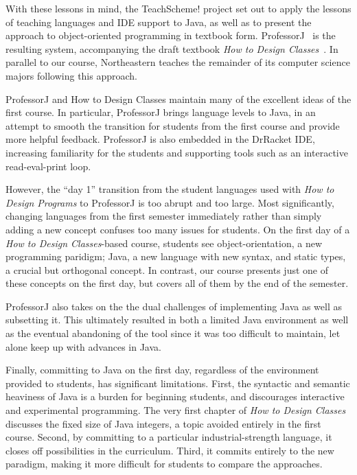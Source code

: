 \documentclass[submission,copyright]{eptcs}
\begin{document}
With these lessons in mind, the TeachScheme! project set out to apply
the lessons of teaching languages and IDE support to Java, as well as
to present the approach to object-oriented programming in textbook
form. ProfessorJ~\cite{dvanhorn:Gray2003ProfessorJ} is the resulting
system, accompanying the draft textbook \emph{How to Design
  Classes}~\cite{local:htdc}.  In parallel to our course, Northeastern
teaches the remainder of its computer science majors following this
approach.

ProfessorJ and How to Design Classes maintain many of the excellent
ideas of the first course.  In particular, ProfessorJ brings language
levels to Java, in an attempt to smooth the transition for students
from the first course and provide more helpful feedback.  ProfessorJ
is also embedded in the DrRacket IDE, increasing familiarity for the
students and supporting tools such as an interactive read-eval-print
loop. 

\def\htdp{\emph{How to Design Programs}\xspace}
\def\htdc{\emph{How to Design Classes}\xspace}
\def\profj{{ProfessorJ}\xspace}

However, the ``day 1'' transition from the student languages used with
\htdp to \profj is too abrupt and too large.
%
Most significantly, changing languages from the first semester
immediately rather than simply adding a new concept confuses too many
issues for students.  On the first day of a \htdc-based course,
students see object-orientation, a new programming paridigm; Java, a
new language with new syntax, and static types, a crucial but
orthogonal concept.
%
In contrast, our course presents just one of these concepts on the
first day, but  covers all of them by the end of the semester.

\profj also takes on the the dual challenges of implementing Java as
well as subsetting it.  This ultimately resulted in both a limited
Java environment as well as the eventual abandoning of the tool since
it was too difficult to maintain, let alone keep up with advances in
Java.  

Finally, committing to Java on the first day, regardless of the
environment provided to students, has significant limitations.  First,
the syntactic and semantic heaviness of Java is a burden for beginning
students, and discourages interactive and experimental programming.
The very first chapter of \htdc discusses the fixed size of Java integers,
a topic avoided entirely in the first course.
Second, by committing to a particular industrial-strength language, it
closes off possibilities in the curriculum.  Third, it commits
entirely to the new paradigm, making it more difficult for students to
compare the approaches. 
\end{document}
